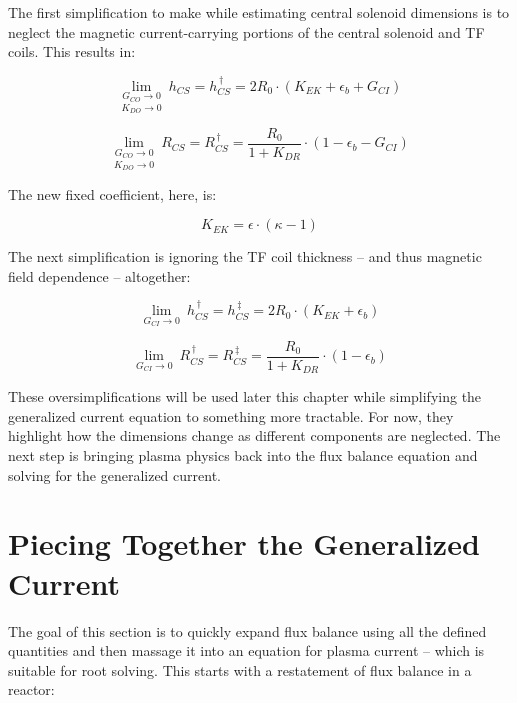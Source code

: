 The first simplification to make while estimating central solenoid dimensions is to neglect the magnetic current-carrying portions of the central solenoid and TF coils. This results in:

\begin{equation}
	\underset{K_{DO} \to 0}{\underset{G_{CO} \to 0}{\lim}} \ h_{CS} = h_{CS}^{\,\dagger} = 2 R_0 \cdot \left( K_{EK} + \epsilon_b + G_{CI} \right) 
\end{equation}

\begin{equation}
	\underset{K_{DO} \to 0}{\underset{G_{CO} \to 0}{\lim}} \ R_{CS} = R_{CS}^{\,\dagger} = \frac{ R_0 }{ 1 + K_{DR} } \cdot \left( 1 - \epsilon_b - G_{CI}  \right)
\end{equation}

The new fixed coefficient, here, is:

\begin{equation}
	K_{EK} = \epsilon \cdot \left( \kappa - 1 \right)
\end{equation}

The next simplification is ignoring the TF coil thickness -- and thus magnetic field dependence -- altogether:

\begin{equation}
	\label{eq:hcs_simple}
	\underset{G_{CI} \to 0}{\lim} \ h_{CS}^{\,\dagger} = h_{CS}^{\,\ddagger} = 2 R_0 \cdot \left( K_{EK} + \epsilon_b \right) 
\end{equation}

\begin{equation}
	\label{eq:rcs_simple}
	\underset{G_{CI} \to 0}{\lim} \ R_{CS}^{\,\dagger} = R_{CS}^{\,\ddagger} = \frac{ R_0 }{ 1 + K_{DR} } \cdot \left( 1 - \epsilon_b  \right)
\end{equation}

These oversimplifications will be used later this chapter while simplifying the generalized current equation to something more tractable. For now, they highlight how the dimensions change as different components are neglected. The next step is bringing plasma physics back into the flux balance equation and solving for the generalized current.

\section{Piecing Together the Generalized Current}

The goal of this section is to quickly expand flux balance using all the defined quantities and then massage it into an equation for plasma current -- which is suitable for root solving. This starts with a restatement of flux balance in a reactor:

